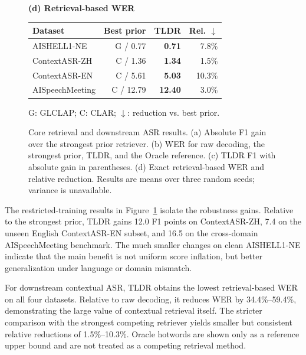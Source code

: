 \begin{figure}[!t]
\begin{minipage}[t]{0.38\textwidth}
    \medskip
    \colorbox{resultorange!10}{\parbox{\dimexpr\linewidth-2\fboxsep\relax}{%
      \centering\color{resultorange}\bfseries (d) Retrieval-based WER}}\par\smallskip
    \begin{tabular*}{\linewidth}{@{\extracolsep{\fill}}lrrr@{}}
      \toprule
      Dataset & Best prior & TLDR & Rel. $\downarrow$ \\
      \midrule
      AISHELL1-NE & G / 0.77 & \textcolor{resultorange}{\textbf{0.71}} & \textcolor{resultorange}{7.8\%} \\
      ContextASR-ZH & C / 1.36 & \textcolor{resultorange}{\textbf{1.34}} & \textcolor{resultorange}{1.5\%} \\
      ContextASR-EN & C / 5.61 & \textcolor{resultorange}{\textbf{5.03}} & \textcolor{resultorange}{10.3\%} \\
      AISpeechMeeting & C / 12.79 & \textcolor{resultorange}{\textbf{12.40}} & \textcolor{resultorange}{3.0\%} \\
      \bottomrule
    \end{tabular*}
    \par\vspace{1pt}
    {\color{gray}\tiny G: GLCLAP; C: CLAR; $\downarrow$: reduction vs. best prior.}
  \end{minipage}
  \caption{Core retrieval and downstream ASR results. (a) Absolute F1 gain over
  the strongest prior retriever. (b) WER for raw decoding, the strongest prior,
  TLDR, and the Oracle reference. (c) TLDR F1 with absolute gain in parentheses.
  (d) Exact retrieval-based WER and relative reduction. Results are means over
  three random seeds; variance is unavailable.}
  \label{fig:main_results}
\end{figure}

The restricted-training results in Figure~\ref{fig:main_results} isolate the
robustness gains. Relative to the strongest prior, TLDR gains 12.0 F1 points on
ContextASR-ZH, 7.4 on the unseen English ContextASR-EN subset, and 16.5 on the
cross-domain AISpeechMeeting benchmark. The much smaller changes on clean
AISHELL1-NE indicate that the main benefit is not uniform score inflation, but
better generalization under language or domain mismatch.

For downstream contextual ASR, TLDR obtains the lowest retrieval-based WER on
all four datasets. Relative to raw decoding, it reduces WER by 34.4\%--59.4\%,
demonstrating the large value of contextual retrieval itself. The stricter
comparison with the strongest competing retriever yields smaller but consistent
relative reductions of 1.5\%--10.3\%. Oracle hotwords are shown only as a
reference upper bound and are not treated as a competing retrieval method.
